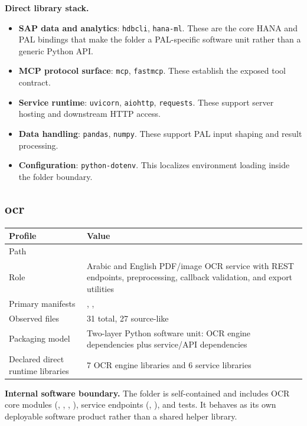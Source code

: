 \documentclass[11pt,a4paper]{article}
\begin{document}
\textbf{Direct library stack.}
\begin{itemize}[leftmargin=*]
    \item \textbf{SAP data and analytics}: \texttt{hdbcli}, \texttt{hana-ml}. These are the core HANA and PAL bindings that make the folder a PAL-specific software unit rather than a generic Python API.
    \item \textbf{MCP protocol surface}: \texttt{mcp}, \texttt{fastmcp}. These establish the exposed tool contract.
    \item \textbf{Service runtime}: \texttt{uvicorn}, \texttt{aiohttp}, \texttt{requests}. These support server hosting and downstream HTTP access.
    \item \textbf{Data handling}: \texttt{pandas}, \texttt{numpy}. These support PAL input shaping and result processing.
    \item \textbf{Configuration}: \texttt{python-dotenv}. This localizes environment loading inside the folder boundary.
\end{itemize}

\subsection{ocr}

\begin{tabular}{@{}P{4.2cm}P{9.8cm}@{}}
\toprule
\textbf{Profile} & \textbf{Value} \\
\midrule
Path &  \\
Role & Arabic and English PDF/image OCR service with REST endpoints, preprocessing, callback validation, and export utilities \\
Primary manifests & , ,  \\
Observed files & 31 total, 27 source-like \\
Packaging model & Two-layer Python software unit: OCR engine dependencies plus service/API dependencies \\
Declared direct runtime libraries & 7 OCR engine libraries and 6 service libraries \\
\bottomrule
\end{tabular}

\textbf{Internal software boundary.} The folder is self-contained and includes OCR core modules (, , , ), service endpoints (, ), and tests. It behaves as its own deployable software product rather than a shared helper library.
\end{document}
